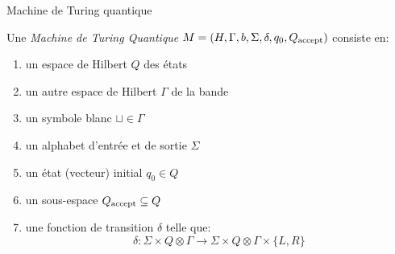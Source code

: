 \documentclass[aspectratio=169]{beamer}
\theoremstyle{plain}
\theoremstyle{definition}
\begin{document}
%
%

\begin{frame}{Machine de Turing quantique}
    \begin{definition}[MTQ] Une \emph{Machine de Turing Quantique} $M = (H, \Gamma, b, \Sigma, \delta, q_0, Q_{\textnormal{accept}})$ consiste en:
        \begin{enumerate}[label=--, noitemsep]
            \item un espace de Hilbert $Q$ des états
            \item un autre espace de Hilbert $\Gamma$ de la bande
            \item un symbole blanc $\sqcup\in \Gamma$
            \item un alphabet d'entrée et de sortie $\Sigma$
            \item un état (vecteur) initial $q_0\in Q$
            \item un sous-espace $Q_{\textnormal{accept}}\subseteq Q$
            \item une fonction de transition $\delta$ telle que:
            \begin{equation*}
                \delta : \Sigma \times Q\otimes \Gamma \to \Sigma \times Q\otimes \Gamma \times \{L, R\}
            \end{equation*}
        \end{enumerate}
    \end{definition}
\end{frame}
\end{document}
